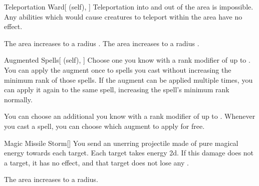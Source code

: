 \lowercase{\hypertarget{spell:Teleportation Ward}{}}\label{spell:Teleportation Ward}
\begin{attuneability}[Rank 4]{\hypertarget{spell:Teleportation Ward}{Teleportation Ward}}[ (self), ]
Teleportation into and out of the area is impossible.
Any abilities which would cause creatures to teleport within the area have no effect.

\rankline
{} The area increases to a \areahuge radius .
 The area increases to a \areaext radius .
\end{attuneability}
\vspace{0.25em}



\lowercase{\hypertarget{spell:Augmented Spells}{}}\label{spell:Augmented Spells}
\begin{attuneability}[Rank 5]{\hypertarget{spell:Augmented Spells}{Augmented Spells}}[ (self), ]
Choose one  you know with a rank modifier of up to .
You can apply the augment once to spells you cast without increasing the minimum rank of those spells.
If the augment can be applied multiple times, you can apply it again to the same spell, increasing the spell's minimum rank normally.

\rankline
{} You can choose an additional  you know with a rank modifier of up to .
Whenever you cast a spell, you can choose which augment to apply for free.
\end{attuneability}
\vspace{0.25em}



\lowercase{\hypertarget{spell:Magic Missile Storm}{}}\label{spell:Magic Missile Storm}
\begin{freeability}[Rank 5]{\hypertarget{spell:Magic Missile Storm}{Magic Missile Storm}}[]
You send an unerring projectile made of pure magical energy towards each target.
Each target takes energy  \minus2d.
If this damage does not  a target, it has no effect, and that target does not lose any .

\rankline
{} The area increases to a \areamed radius.
\end{freeability}
\vspace{0.25em}



